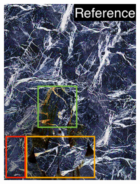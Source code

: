 \begin{figure}[]
\begin{subfigure}{0.6\textwidth}
\begin{subfigure}{0.48\textwidth}
            \includegraphics[width=\textwidth]{images/04-experiment02/human/marble/pixel_proj_highlighted2.jpg}
            \caption*{}
        \end{subfigure}
        \hfill
        \begin{subfigure}{0.48\textwidth}
            \centering
            \begin{subfigure}{0.32\textwidth}
                \centering

\end{subfigure}
\end{subfigure}
\end{subfigure}
\end{figure}

